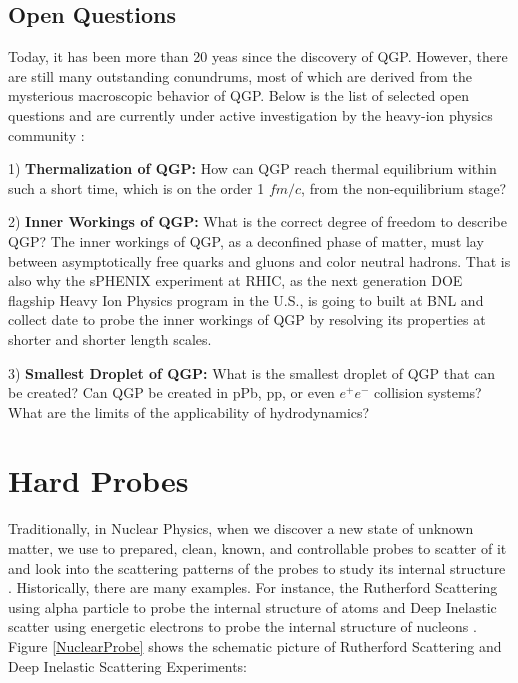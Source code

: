 

 


\subsection{Open Questions}

Today, it has been more than 20 yeas since the discovery of QGP. However, there are still many outstanding conundrums, most of which are derived from the mysterious macroscopic behavior of QGP. Below is the list of selected open questions and are currently under active investigation by the heavy-ion physics community \cite{BigQuestions}:

1) \textbf{Thermalization of QGP:} How can QGP reach thermal equilibrium within such a short time, which is on the order 1 $fm/c$, from the non-equilibrium stage?

2) \textbf{Inner Workings of QGP:} What is the correct degree of freedom to describe QGP? The inner workings of QGP, as a deconfined phase of matter, must lay between asymptotically free quarks and gluons and color neutral hadrons. That is also why the sPHENIX experiment at RHIC, as the next generation DOE flagship Heavy Ion Physics program in the U.S., is going to built at BNL and collect date to probe the inner workings of QGP by resolving its properties at shorter and shorter length scales. 

3) \textbf{Smallest Droplet of QGP:} What is the smallest droplet of QGP that can be created? Can QGP be created in pPb, pp, or even $e^+e^-$ collision systems? What are the limits of the applicability of hydrodynamics?


\section{Hard Probes}

Traditionally, in Nuclear Physics, when we discover a new state of unknown matter, we use to prepared, clean, known, and controllable probes to scatter of it and look into the scattering patterns of the probes to study its internal structure . Historically, there are many examples. For instance, the Rutherford Scattering using alpha particle to probe the internal structure of atoms \cite{Rutherford} and Deep Inelastic scatter using energetic electrons to probe the internal structure of nucleons \cite{Henry,Richard,Jerry}. Figure \ref{NuclearProbe} shows the schematic picture of Rutherford Scattering and Deep Inelastic Scattering Experiments:

